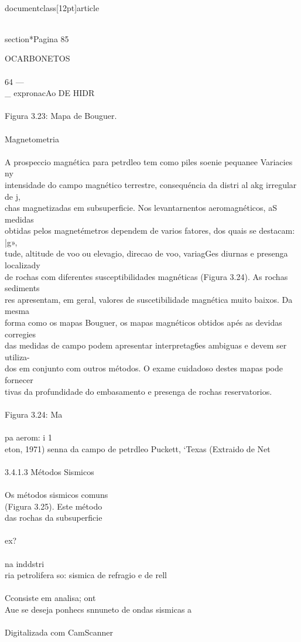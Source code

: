\\documentclass[12pt]{article}
\begin{document}
{\\section*{Pagina 85}

OCARBONETOS\\
\\
64 —\\_ expronacAo DE HIDR\\
\\
Figura 3.23: Mapa de Bouguer.\\
\\
Magnetometria\\
\\
A prospeccio magnética para petrdleo tem como piles soenie pequanee Variacies ny\\
intensidade do campo magnético terrestre, consequéncia da distri al akg irregular de j,\\
chas magnetizadas em subsuperficie. Nos levantarnentos aeromagnéticos, aS medidas\\
obtidas pelos magnetémetros dependem de varios fatores, dos quais se destacam: |g»,\\
tude, altitude de voo ou elevagio, direcao de voo, variagGes diurnas e presenga localizady\\
de rochas com diferentes susceptibilidades magnéticas (Figura 3.24). As rochas sediments\\
res apresentam, em geral, valores de suscetibilidade magnética muito baixos. Da mesma\\
forma como os mapas Bouguer, os mapas magnéticos obtidos apés as devidas corregies\\
das medidas de campo podem apresentar interpretag6es ambiguas e devem ser utiliza-\\
dos em conjunto com outros métodos. O exame cuidadoso destes mapas pode fornecer\\
tivas da profundidade do embasamento e presenga de rochas reservatorios.\\
\\
Figura 3.24: Ma\\
\\
pa aerom: i 1\\
eton, 1971) senna da campo de petrdleo Puckett, ‘Texas (Extraido de Net\\
\\
3.4.1.3 Métodos Sismicos\\
\\
Os métodos sismicos comuns\\
(Figura 3.25). Este método\\
das rochas da subsuperficie\\
\\
ex?\\
\\
na inddstri\\
ria petrolifera so: sismica de refragio e de rell\\
\\
Cconsiste em analisa; ont\\
Aue se deseja ponhecs snnuneto de ondas sismicas a\\
\\
Digitalizada com CamScanner\\

}
\end{document}
